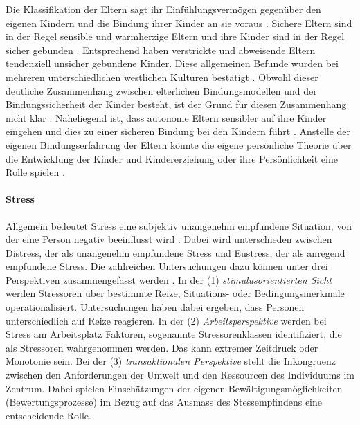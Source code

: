 Die Klassifikation der Eltern sagt ihr Einfühlungsvermögen gegenüber den eigenen Kindern und die Bindung ihrer Kinder an sie voraus \cite{Siegler2008}. Sichere Eltern sind in der Regel sensible und warmherzige Eltern und ihre Kinder sind in der Regel sicher gebunden \cite{Magai2000, Steele1996}. Entsprechend haben verstrickte und abweisende Eltern tendenziell unsicher gebundene Kinder. Diese allgemeinen Befunde wurden bei mehreren unterschiedlichen westlichen Kulturen bestätigt \cite{Hesse1999}. Obwohl dieser deutliche Zusammenhang zwischen elterlichen Bindungsmodellen und der Bindungssicherheit der Kinder besteht, ist der Grund für diesen Zusammenhang nicht klar \cite{Siegler2008}. Naheliegend ist, dass autonome Eltern sensibler auf ihre Kinder eingehen und dies zu einer sicheren Bindung bei den Kindern führt \cite{Pederson1998}. Anstelle der eigenen Bindungserfahrung der Eltern könnte die eigene persönliche Theorie über die Entwicklung der Kinder und Kindererziehung oder ihre Persönlichkeit  eine Rolle spielen \cite{Thompson1998}.

\paragraph{Stress}\label{sec:Stress}
Allgemein bedeutet Stress eine subjektiv unangenehm empfundene Situation, von der eine Person negativ beeinflusst wird \cite[S.~1500]{Stress2014}. Dabei wird unterschieden zwischen Distress, der als unangenehm empfundene Stress und Eustress, der als anregend empfundene Stress. Die zahlreichen Untersuchungen dazu können unter drei Perspektiven zusammengefasst werden \cite[S.~1500]{Stress2014}. In der (1) \textit{stimulusorientierten Sicht} werden Stressoren über bestimmte Reize, Situations- oder Bedingungsmerkmale operationalisiert. Untersuchungen haben dabei ergeben, dass Personen unterschiedlich auf Reize reagieren. In der (2) \textit{Arbeitsperspektive} werden bei Stress am Arbeitsplatz Faktoren, sogenannte Stressorenklassen identifiziert, die als Stressoren wahrgenommen werden. Das kann extremer Zeitdruck oder Monotonie sein. Bei der (3) \textit{transaktionalen Perspektive} steht die Inkongruenz zwischen den Anforderungen der Umwelt und den Ressourcen des Individuums im Zentrum. Dabei spielen Einschätzungen der eigenen Bewältigungsmöglichkeiten (Bewertungsprozesse) im Bezug auf das Ausmass des Stessempfindens eine entscheidende Rolle. 

